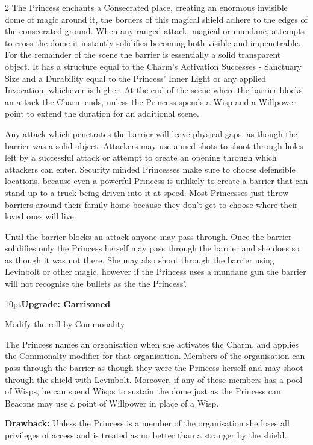 \begin{multicols}{2}
\noindent The Princess enchants a Consecrated place, creating an enormous invisible dome of magic around it, the borders of this magical shield adhere to the edges of the consecrated ground. When any ranged attack, magical or mundane, attempts to cross the dome it instantly solidifies becoming both visible and impenetrable. For the remainder of the scene the barrier is essentially a solid transparent object. It has a structure equal to the Charm's Activation Successes - Sanctuary Size and a Durability equal to the Princess' Inner Light or any applied Invocation, whichever is higher. At the end of the scene where the barrier blocks an attack the Charm ends, unless the Princess spends a Wisp and a Willpower point to extend the duration for an additional scene. 

Any attack which penetrates the barrier will leave physical gaps, as though the barrier was a solid object. Attackers may use aimed shots to shoot through holes left by a successful attack or attempt to create an opening through which attackers can enter. Security minded Princesses make sure to choose defensible locations, because even a powerful Princess is unlikely to create a barrier that can stand up to a truck being driven into it at speed. Most Princesses just throw barriers around their family home because they don't get to choose where their loved ones will live. 

Until the barrier blocks an attack anyone may pass through. Once the barrier solidifies only the Princess herself may pass through the barrier and she does so as though it was not there. She may also shoot through the barrier using Levinbolt or other magic, however if the Princess uses a mundane gun the barrier will not recognise the bullets as the the Princess'. 

\begin{myindentpar}{10pt}\textbf{Upgrade: Garrisoned}

Modify the roll by Commonality

The Princess names an organisation when she activates the Charm, and applies the Commonalty modifier for that organisation. Members of the organisation can pass through the barrier as though they were the Princess herself and may shoot through the shield with Levinbolt. Moreover, if any of these members has a pool of Wisps, he can spend Wisps to sustain the dome just as the Princess can. Beacons may use a point of Willpower in place of a Wisp. 

\textbf{Drawback:} Unless the Princess is a member of the organisation she loses all privileges of access and is treated as no better than a stranger by the shield.


\end{myindentpar}
\end{multicols}
